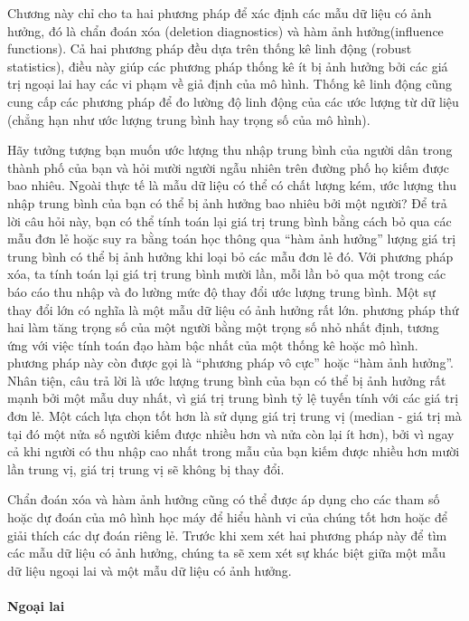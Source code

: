 Chương này chỉ cho ta hai phương pháp để xác định các mẫu dữ liệu có ảnh hưởng, đó là chẩn đoán xóa (deletion diagnostics) và hàm ảnh hưởng(influence functions). Cả hai phương pháp đều dựa trên thống kê linh động (robust statistics), điều này giúp các phương pháp thống kê ít bị ảnh hưởng bởi các giá trị ngoại lai hay các vi phạm về giả định của mô hình. Thống kê linh động cũng cung cấp các phương pháp để đo lường độ linh động của các ước lượng từ dữ liệu (chẳng hạn như ước lượng trung bình hay trọng số của mô hình).

Hãy tưởng tượng bạn muốn ước lượng thu nhập trung bình của người dân trong thành phố của bạn và hỏi mười người ngẫu nhiên trên đường phố họ kiếm được bao nhiêu. Ngoài thực tế là mẫu dữ liệu có thể có chất lượng kém, ước lượng thu nhập trung bình của bạn có thể bị ảnh hưởng bao nhiêu bởi một người? Để trả lời câu hỏi này, bạn có thể tính toán lại giá trị trung bình bằng cách bỏ qua các mẫu đơn lẻ hoặc suy ra bằng toán học thông qua ``hàm ảnh hưởng'' lượng giá trị trung bình có thể bị ảnh hưởng khi loại bỏ các mẫu đơn lẻ đó. Với phương pháp xóa, ta tính toán lại giá trị trung bình mười lần, mỗi lần bỏ qua một trong các báo cáo thu nhập và đo lường mức độ thay đổi ước lượng trung bình. Một sự thay đổi lớn có nghĩa là một mẫu dữ liệu có ảnh hưởng rất lớn. phương pháp thứ hai làm tăng trọng số của một người bằng một trọng số nhỏ nhất định, tương ứng với việc tính toán đạo hàm bậc nhất của một thống kê hoặc mô hình. phương pháp này còn được gọi là ``phương pháp vô cực'' hoặc ``hàm ảnh hưởng''. Nhân tiện, câu trả lời là ước lượng trung bình của bạn có thể bị ảnh hưởng rất mạnh bởi một mẫu duy nhất, vì giá trị trung bình tỷ lệ tuyến tính với các giá trị đơn lẻ. Một cách lựa chọn tốt hơn là sử dụng giá trị trung vị (median - giá trị mà tại đó một nửa số người kiếm được nhiều hơn và nửa còn lại ít hơn), bởi vì ngay cả khi người có thu nhập cao nhất trong mẫu của bạn kiếm được nhiều hơn mười lần trung vị, giá trị trung vị sẽ không bị thay đổi.

Chẩn đoán xóa và hàm ảnh hưởng cũng có thể được áp dụng cho các tham số hoặc dự đoán của mô hình học máy để hiểu hành vi của chúng tốt hơn hoặc để giải thích các dự đoán riêng lẻ. Trước khi xem xét hai phương pháp này để tìm các mẫu dữ liệu có ảnh hưởng, chúng ta sẽ xem xét sự khác biệt giữa một mẫu dữ liệu ngoại lai và một mẫu dữ liệu có ảnh hưởng.

\paragraph{Ngoại lai}

